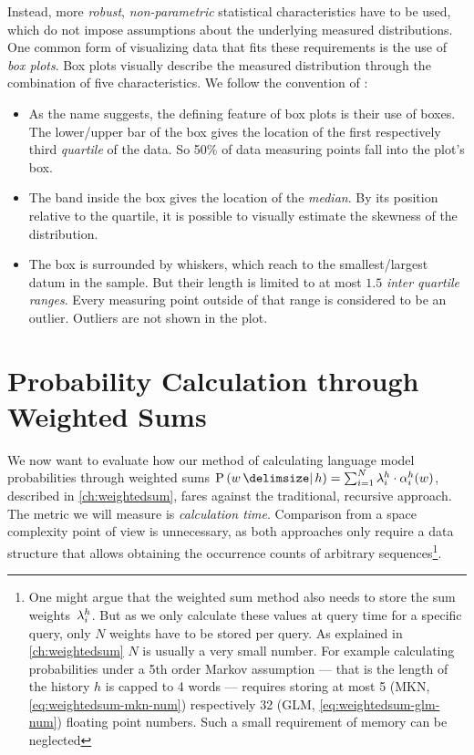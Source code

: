 Instead, more \emph{robust}, \emph{non-parametric} statistical characteristics
have to be used, which do not impose assumptions about the underlying
measured distributions.
One common form of visualizing data that fits these requirements is the use of
\emph{box plots}.
Box plots visually describe the measured distribution through the combination of
five characteristics.
We follow the convention of \textcite{Tukey1977}:
\begin{itemize}
  \item As the name suggests, the defining feature of box plots is their use of
    boxes.
    The lower/upper bar of the box gives the location of the first
    respectively third \emph{quartile} of the data.
    So 50\% of data measuring points fall into the plot's box.
  \item The band inside the box gives the location of the \emph{median}.
    By its position relative to the quartile, it is possible to visually estimate
    the skewness of the distribution.
  \item The box is surrounded by whiskers, which reach to the smallest/largest
    datum in the sample.
    But their length is limited to at most $1.5$ \emph{inter quartile ranges}.
    Every measuring point outside of that range is considered to be an outlier.
    Outliers are not shown in the plot.
\end{itemize}

\section{Probability Calculation through Weighted Sums}
\label{sec:evaluation-weightedsum}

We now want to evaluate how our method of calculating language model
probabilities through weighted sums
\mbox{$\Prob{w}{h} = \sum_{i = 1}^{N} \SumWeight^h_i \cdot \SumArg_i^h(w)$},
described in \cref{ch:weightedsum}, fares against the traditional, recursive
approach.
The metric we will measure is \emph{calculation time}.
Comparison from a space complexity point of view is unnecessary, as both
approaches only require a data structure that allows obtaining the occurrence
counts of arbitrary sequences\footnote{One might argue that the weighted sum
method also needs to store the sum weights~$\lambda^h_i$. But as we only
calculate these values at query time for a specific query, only $N$ weights have
to be stored per query. As explained in \cref{ch:weightedsum} $N$ is usually a
very small number. For example calculating probabilities under a 5th order
Markov assumption --- that is the length of the history $h$ is capped to 4 words
--- requires storing at most 5 (MKN, \cref{eq:weightedsum-mkn-num}) respectively
32 (GLM, \cref{eq:weightedsum-glm-num}) floating point numbers.
Such a small requirement of memory can be neglected}.

